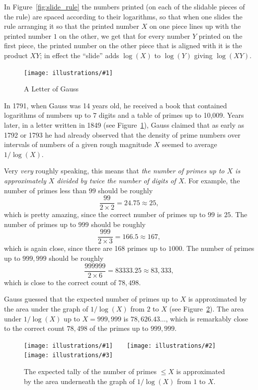 \documentclass[openany]{book}
\newcommand{\ill}[3]{%
   \begin{figure}[H]%
   \vspace{-2ex}
   \centering%
   \texttt{[image: illustrations/\#1]}%
   \caption{#3}%
   \vspace{-2ex}
    \end{figure}}
\newcommand{\illthree}[5]{%
   \begin{figure}[H]%
\centering%
   \texttt{[image: illustrations/\#1]}$\qquad$\texttt{[image: illustrations/\#2]}$\qquad$\texttt{[image: illustrations/\#3]}%
   \caption{#5}%
    \end{figure}}
\theoremstyle{plain}
\theoremstyle{definition}
\begin{document}
In Figure~\ref{fig:slide_rule} the numbers printed (on each of the slidable pieces of the rule)
are spaced according to their logarithms, so that when one slides the
rule arranging it so that the printed  number $X$ on one piece lines up
with the printed number $1$ on the other, we get that for every number $Y$
printed on the first piece, the printed number on the other piece that
is  aligned with it is the product $XY$; in effect the ``slide'' adds
$\log(X)$ to $\log(Y)$ giving $\log(XY)$.

\ill{gauss_tables_half}{.9}{A Letter of Gauss\label{fig:gauss_letter}}

In 1791, when Gauss was 14 years old, he received a book that contained
logarithms of numbers up to $7$ digits and a table of primes up to 10,009.
Years later, in a letter
written in 1849 (see Figure~\ref{fig:gauss_letter}), Gauss
claimed that as early as 1792 or 1793 he had already observed that the
density of prime numbers over intervals of numbers of a given rough
magnitude $X$ seemed to average $1/\log(X)$.

 Very {\em very} roughly speaking, this
means that {\em the number of primes up to $X$ is approximately $X$ divided by
twice the number of digits of $X$}.  For example,
the number of primes less than $99$ should be roughly
$$
   \frac{99}{2\times 2} = 24.75 \approx  25,
$$
which is pretty amazing, since the correct number of
primes up to $99$ is $25$.  The number of primes up to $999$ should
be roughly
$$
   \frac{999}{2\times 3} = 166.5 \approx  167,
$$
which is again close, since there are 168 primes up to $1000$.
The number of primes up to $999{,}999$ should be roughly
$$
   \frac{999999}{2\times 6} = 83333.25 \approx  83{,}333,
$$
which is close to the correct count of $78{,}498$.

Gauss guessed that the expected number of primes up to $X$
is approximated by the area under the
graph of $1/\log(X)$ from $2$ to $X$ (see Figure~\ref{fig:G}).
The area under $1/\log(X)$ up to $X=999{,}999$ is $78{,}626.43\ldots$, which
is remarkably close to the correct count $78{,}498$ of the primes
up to $999{,}999$.

\illthree{area_under_log_graph_30}{area_under_log_graph_100}{area_under_log_graph_1000}{.27}{The
  expected tally of the number of primes $\leq X$ is approximated by the
  area underneath the graph of $1/\log(X)$ from $1$ to $X$.\label{fig:G}}
\end{document}
